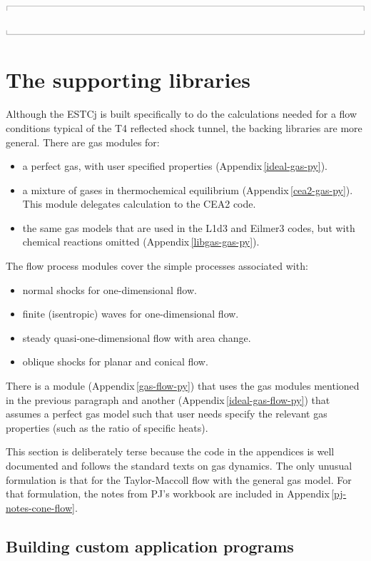 \documentclass[10pt,a4paper]{article}
\newcommand{\topbar}{\ensuremath{
    \rule{0.1mm}{2.0mm} \rule[2.0mm]{159.5mm}{0.1mm} \rule{0.1mm}{2.0mm}
}}
\newcommand{\bottombar}{\ensuremath{
    \rule{0.1mm}{2.0mm} \rule{159.5mm}{0.1mm} \rule{0.1mm}{2.0mm}
}}
\begin{document}
\medskip
\noindent\topbar

\bottombar

\newpage
\section{The supporting libraries}
\label{the-libraries}
%
Although the ESTCj is built specifically to do the calculations needed for a
flow conditions typical of the T4 reflected shock tunnel,
the backing libraries are more general.
There are gas modules for:
\begin{itemize}
 \item a perfect gas, with user specified properties (Appendix\,\ref{ideal-gas-py}).
 \item a mixture of gases in thermochemical equilibrium (Appendix\,\ref{cea2-gas-py}).
   This module delegates calculation to the CEA2 code.
 \item the same gas models that are used in the L1d3 and Eilmer3 codes,
   but with chemical reactions omitted (Appendix\,\ref{libgas-gas-py}).
\end{itemize}
%
The flow process modules cover the simple processes associated with:
\begin{itemize}
 \item normal shocks for one-dimensional flow.
 \item finite (isentropic) waves for one-dimensional flow.
 \item steady quasi-one-dimensional flow with area change.
 \item oblique shocks for planar and conical flow.
\end{itemize}
There is a module (Appendix\,\ref{gas-flow-py}) that uses 
the gas modules mentioned in the previous paragraph
and another (Appendix\,\ref{ideal-gas-flow-py})
that assumes a perfect gas model such that user needs specify the
relevant gas properties (such as the ratio of specific heats).

\medskip
This section is deliberately terse because the code in the appendices is well documented
and follows the standard texts on gas dynamics.
The only unusual formulation is that for the Taylor-Maccoll flow with the general gas model.
For that formulation, the notes from PJ's workbook are included 
in Appendix\,\ref{pj-notes-cone-flow}.


\bigskip
\subsection{Building custom application programs}
\label{custom-apps}
%
\end{document}
